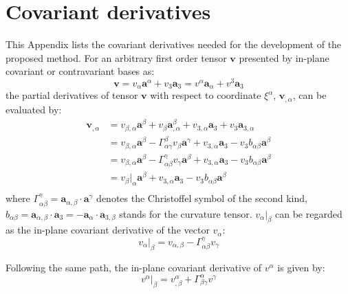 \section{Covariant derivatives}\label{appderivative}
This Appendix lists the covariant derivatives needed for the development of the proposed method. For an arbitrary first order tensor $\boldsymbol v$ presented by in-plane covariant or contravariant bases as: 
\begin{equation}
\boldsymbol v = v_{\alpha}\boldsymbol a^\alpha + v_{3} \boldsymbol a_3 = v^{\alpha}\boldsymbol a_\alpha + v^3 \boldsymbol a_3
\end{equation}
the partial derivatives of tensor $\boldsymbol v$ with respect to coordinate $\xi^\alpha$, $\boldsymbol v_{,\alpha}$, can be evaluated by:
\begin{equation}
\begin{split}
\boldsymbol v_{,\alpha} &= 
v_{\beta,\alpha} \boldsymbol a^\beta + v_{\beta}\boldsymbol a^\beta_{,\alpha} + v_{3,\alpha}\boldsymbol a_3 + v_3 \boldsymbol a_{3,\alpha} \\
&= v_{\beta,\alpha} \boldsymbol a^\beta - \Gamma^\beta_{\alpha\gamma}v_\beta \boldsymbol a^\gamma + v_{3,\alpha} \boldsymbol a_3 - v_3 b_{\alpha\beta} \boldsymbol a^\beta \\
&= v_{\beta,\alpha} \boldsymbol a^\beta - \Gamma^\gamma_{\alpha\beta}v_\gamma \boldsymbol a^\beta + v_{3,\alpha} \boldsymbol a_3 - v_3 b_{\alpha\beta} \boldsymbol a^\beta \\
&= v_{\beta}\vert_\alpha \boldsymbol a^\beta + v_{3,\alpha} \boldsymbol a_3 - v_3 b_{\alpha\beta} \boldsymbol a^\beta \\
\end{split}
\end{equation}
where $\Gamma^\gamma_{\alpha\beta} = \boldsymbol a_{\alpha,\beta}\cdot \boldsymbol a^\gamma$ denotes the Christoffel symbol of the second kind, $b_{\alpha\beta} = \boldsymbol a_{\alpha,\beta}\cdot\boldsymbol a_3=-\boldsymbol a_{\alpha}\cdot\boldsymbol a_{3,\beta}$ stands for the curvature tensor. $v_\alpha\vert_\beta$ can be regarded as the in-plane covariant derivative of the vector $v_\alpha$:
\begin{equation}
v_{\alpha}\vert_\beta = v_{\alpha,\beta} - \Gamma^\gamma_{\alpha\beta} v_\gamma
\end{equation}

Following the same path, the in-plane covariant derivative of $v^\alpha$ is given by:
\begin{equation}
v^\alpha\vert_\beta = v^\alpha_{,\beta} + \Gamma^\alpha_{\beta\gamma} v^\gamma
\end{equation}

